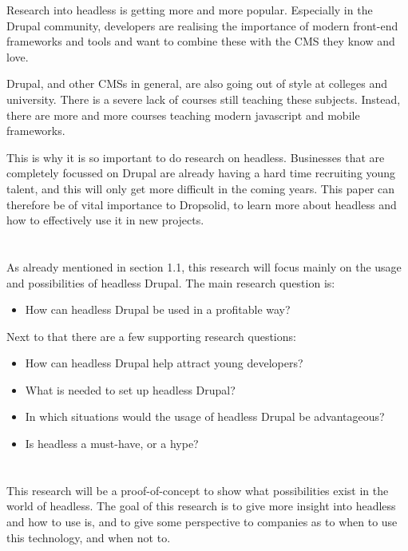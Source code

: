 Research into headless is getting more and more popular. Especially in the Drupal community, developers are realising the importance of modern front-end frameworks and tools and want to combine these with the CMS they know and love. 

Drupal, and other CMSs in general, are also going out of style at colleges and university. There is a severe lack of courses still teaching these subjects. Instead, there are more and more courses teaching modern javascript and mobile frameworks.

This is why it is so important to do research on headless. Businesses that are completely focussed on Drupal are already having a hard time recruiting young talent, and this will only get more difficult in the coming years. This paper can therefore be of vital importance to Dropsolid, to learn more about headless and how to effectively use it in new projects.

\section{}
\label{sec:onderzoeksvraag}

As already mentioned in section 1.1, this research will focus mainly on the usage and possibilities of headless Drupal. The main research question is:
\begin{itemize}
	\item How can headless Drupal be used in a profitable way? 
\end{itemize}

Next to that there are a few supporting research questions:
\begin{itemize}
	\item How can headless Drupal help attract young developers?
	\item What is needed to set up headless Drupal?
	\item In which situations would the usage of headless Drupal be advantageous?
	\item Is headless a must-have, or a hype?
\end{itemize}

\section{}
\label{sec:onderzoeksdoelstelling}

This research will be a proof-of-concept to show what possibilities exist in the world of headless. The goal of this research is to give more insight into headless and how to use is, and to give some perspective to companies as to when to use this technology, and when not to.

